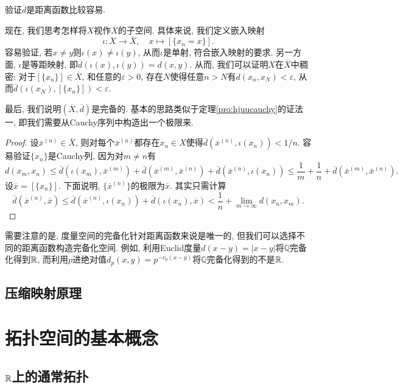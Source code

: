 验证$\overline{d}$是距离函数比较容易. 

现在, 我们思考怎样将$X$视作$\overline{X}$的子空间. 具体来说, 我们定义嵌入映射$$\iota : X \to \overline{X},\quad x \mapsto [\{ x_n=x \}]. $$
容易验证, 若$x\neq y$则$\iota (x) \neq \iota (y)$, 从而$\iota$是单射, 符合嵌入映射的要求. 另一方面, $\iota$是等距映射, 即$\overline{d} (\iota (x),\iota (y)) = d(x,y)$. 从而, 我们可以证明$X$在$\overline{X}$中稠密: 对于$[\{ x_n \}] \in \overline{X}$, 和任意的$\varepsilon >0$, 存在$N$使得任意$n>N$有$d(x_n,x_N)<\varepsilon$, 从而$\overline{d} (\iota (x_N),[\{ x_n \}]) < \varepsilon$. 

最后, 我们说明$(\overline{X}, \overline{d})$是完备的. 基本的思路类似于定理\ref{pro:hjuucauchy}的证法一, 即我们需要从Cauchy序列中构造出一个极限来. 

\begin{proof}
	设$\overline{x}^{(n)} \in \overline{X}$, 则对每个$\overline{x}^{(n)}$都存在$x_n \in X$使得$\overline{d}(\overline{x}^{(n)},\iota (x_n))<1/n$. 容易验证$\{ x_n \}$是Cauchy列, 因为对$m \neq n$有$$d(x_m,x_n) \leq \overline{d} (\iota (x_m), \overline{x}^{(m)}) + \overline{d} (\overline{x}^{(m)}, \overline{x}^{(n)}) + \overline{d} (\overline{x}^{(n)}, \iota (x_n)) \leq \frac{1}{m} + \frac{1}{n} + \overline{d} (\overline{x}^{(m)}, \overline{x}^{(n)}). $$
	设$\overline{x} = [\{ x_n \}]$. 下面说明, $\{ \overline{x}^{(n)} \}$的极限为$\overline{x}$. 其实只需计算$$\overline{d} (\overline{x}^{(n)} , \overline{x}) \leq \overline{d}(\overline{x}^{(n)},\iota (x_n)) + \overline{d}(\iota (x_n),\overline{x}) < \frac{1}{n} + \lim_{m\to \infty} d(x_n,x_m). $$
\end{proof}

需要注意的是, 度量空间的完备化针对距离函数来说是唯一的, 但我们可以选择不同的距离函数构造完备化空间. 例如, 利用Euclid度量$d(x-y)=|x-y|$将$\mathbb{Q}$完备化得到$\mathbb{R}$, 而利用$p$进绝对值$d_p(x,y) = p^{-v_p(x-y)}$将$\mathbb{Q}$完备化得到的不是$\mathbb{R}$. 

\subsection{压缩映射原理}



\newpage
\section{拓扑空间的基本概念}

\subsection{$\mathbb{R}$上的通常拓扑}

